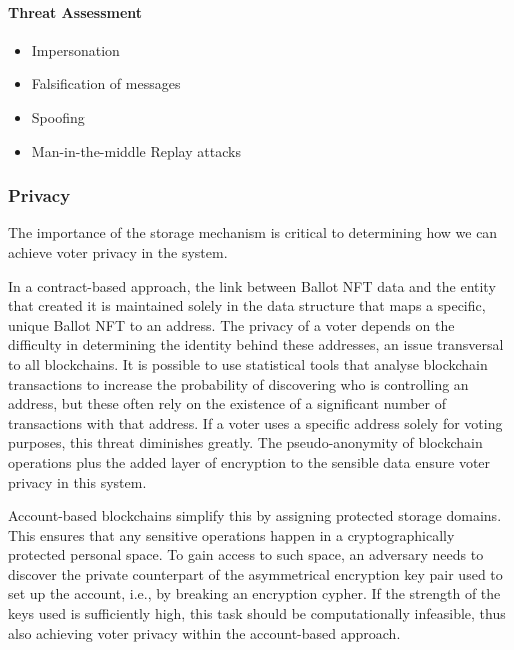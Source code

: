 \documentclass[../main.tex]{subfiles}
\begin{document}
\paragraph{Threat Assessment}
\begin{itemize}

    \item{Impersonation}

    \item{Falsification of messages}

    \item{Spoofing}

    \item{Man-in-the-middle Replay attacks}

\end{itemize}

\subsubsection{Privacy}
\label{sec:voter_privacy}
The importance of the storage mechanism is critical to determining how we can achieve voter privacy in the system.
\par
In a contract-based approach, the link between Ballot NFT data and the entity that created it is maintained solely in the data structure that maps a specific, unique Ballot NFT to an address. The privacy of a voter depends on the difficulty in determining the identity behind these addresses, an issue transversal to all blockchains. It is possible to use statistical tools that analyse blockchain transactions to increase the probability of discovering who is controlling an address, but these often rely on the existence of a significant number of transactions with that address. If a voter uses a specific address solely for voting purposes, this threat diminishes greatly. The pseudo-anonymity of blockchain operations plus the added layer of encryption to the sensible data ensure voter privacy in this system.
\par
Account-based blockchains simplify this by assigning protected storage domains. This ensures that any sensitive operations happen in a cryptographically protected personal space. To gain access to such space, an adversary needs to discover the private counterpart of the asymmetrical encryption key pair used to set up the account, i.e., by breaking an encryption cypher. If the strength of the keys used is sufficiently high, this task should be computationally infeasible, thus also achieving voter privacy within the account-based approach.
\end{document}
